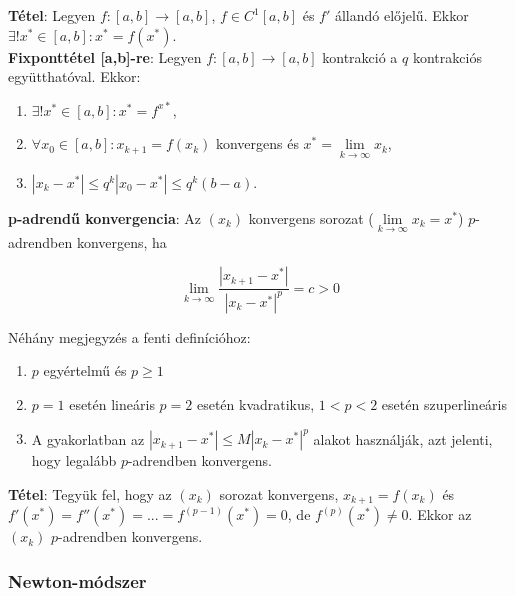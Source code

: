 \documentclass[margin=0px]{article}
\begin{document}
	\noindent \textbf{Tétel}: Legyen $f : [a,b] \to [a,b]$, $f \in C^{1}[a,b]$ és $f'$ állandó előjelű. Ekkor $\exists!
	x^{*} \in [a,b]: x^{*} = f(x^{*})$.\\
	
	\noindent \textbf{Fixponttétel [a,b]-re}: Legyen $f : [a,b] \to [a,b]$ kontrakció a $q$ kontrakciós együtthatóval.
	Ekkor:
	
	\begin{enumerate}
		\item	$\exists! x^{*} \in [a,b]: x^{*} = f^{x*}$,
		
		\item	$\forall x_{0} \in [a,b]: x_{k+1} = f(x_{k})$ konvergens és $x^{*} = \lim\limits_{k \to \infty} x_{k}$,
		
		\item	$| x_{k} - x^{*} | \leq q^{k} | x_{0} - x^{*}| \leq q^{k}(b-a)$.
	\end{enumerate}
	
	\noindent \textbf{p-adrendű konvergencia}: Az $(x_{k})$ konvergens sorozat ($\lim\limits_{k \to \infty} x_{k} = x^{*}$)
	$p$-adrendben konvergens, ha
	
	\begin{displaymath}
		\lim\limits_{k \to \infty} \frac{|x_{k+1} - x^{*}|}{|x_{k}-x^{*}|^{p}} = c > 0
	\end{displaymath}
	
	\noindent Néhány megjegyzés a fenti definícióhoz:
	
	\begin{enumerate}
		\item	$p$ egyértelmű és $p \geq 1$
		
		\item	$p=1$ esetén lineáris $p=2$ esetén kvadratikus, $1 < p < 2$ esetén szuperlineáris
		
		\item	A gyakorlatban az $|x_{k+1} - x^{*}| \leq M|x_{k} - x^{*}|^{p}$ alakot használják, azt jelenti, hogy
		legalább $p$-adrendben konvergens.
	\end{enumerate}
	
	\noindent \textbf{Tétel}: Tegyük fel, hogy az $(x_{k})$ sorozat konvergens,
	$x_{k+1} = f(x_{k})$ és $f'(x^{*}) = f''(x^{*}) = ... = f^{(p-1)}(x^{*}) = 0$, de $f^{(p)}(x^{*}) \not = 0$.
	Ekkor az $(x_{k})$ $p$-adrendben konvergens.
	
	\subsubsection{Newton-módszer}
	
\end{document}
